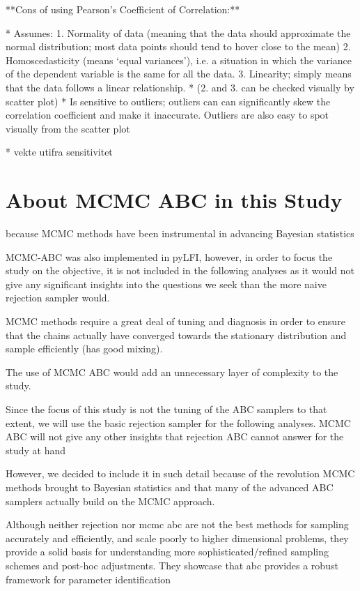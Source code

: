 **Cons of using Pearson's Coefficient of Correlation:**

* Assumes:
    1. Normality of data (meaning that the data should approximate the normal distribution; most data points should tend to hover close to the mean)
    2. Homoscedasticity (means ‘equal variances’), i.e. a situation in which the variance of the dependent variable is the same for all the data.
    3. Linearity; simply means that the data follows a linear relationship. 
* (2. and 3. can be checked visually by scatter plot)
* Is sensitive to outliers; outliers can can significantly skew the correlation coefficient and make it inaccurate. Outliers are also easy to spot visually from the scatter plot

* vekte utifra sensitivitet

\section{About MCMC ABC in this Study}

because MCMC methods have been instrumental in advancing Bayesian statistics

MCMC-ABC was also implemented in pyLFI, however, in order to focus the study on the objective, it is not included in the following analyses as it would not give any significant insights into the questions we seek than the more naive rejection sampler would. 

MCMC methods require a great deal of tuning and diagnosis in order to ensure that the chains actually have converged towards the stationary distribution and sample efficiently (has good mixing).

The use of MCMC ABC would add an unnecessary layer of complexity to the study.

Since the focus of this study is not the tuning of the ABC samplers to that extent, we will use the basic rejection sampler for the following analyses. MCMC ABC will not give any other insights that rejection ABC cannot answer for the study at hand 

However, we decided to include it in such detail because of the revolution MCMC methods brought to Bayesian statistics and that many of the advanced ABC samplers actually build on the MCMC approach. 

Although neither rejection nor mcmc abc are not the best methods for sampling accurately and efficiently, and scale poorly to higher dimensional problems, they provide a solid basis for understanding more sophisticated/refined sampling schemes and post-hoc adjustments. They showcase that abc provides a robust framework for parameter identification

